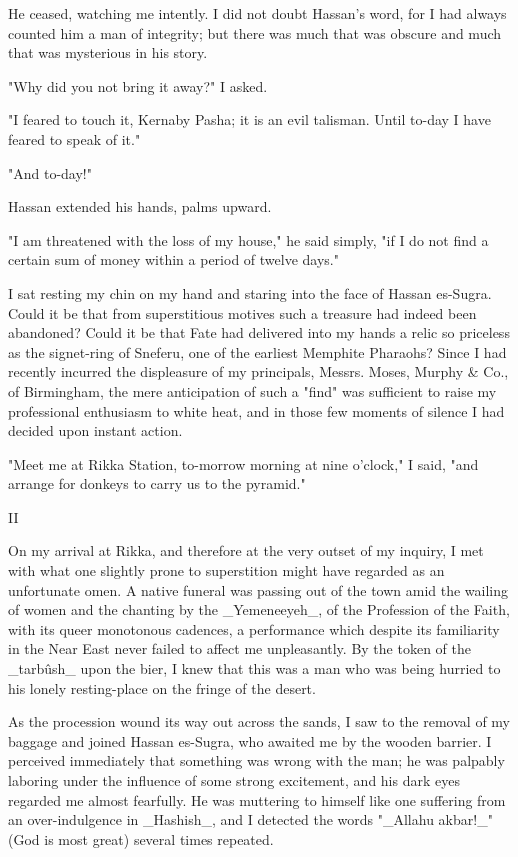 He ceased, watching me intently. I did not doubt Hassan's word, for I
had always counted him a man of integrity; but there was much that was
obscure and much that was mysterious in his story.

"Why did you not bring it away?" I asked.

"I feared to touch it, Kernaby Pasha; it is an evil talisman. Until
to-day I have feared to speak of it."

"And to-day!"

Hassan extended his hands, palms upward.

"I am threatened with the loss of my house," he said simply, "if I do
not find a certain sum of money within a period of twelve days."

I sat resting my chin on my hand and staring into the face of Hassan
es-Sugra. Could it be that from superstitious motives such a treasure
had indeed been abandoned? Could it be that Fate had delivered into
my hands a relic so priceless as the signet-ring of Sneferu, one of
the earliest Memphite Pharaohs? Since I had recently incurred the
displeasure of my principals, Messrs. Moses, Murphy & Co., of
Birmingham, the mere anticipation of such a "find" was sufficient to
raise my professional enthusiasm to white heat, and in those few
moments of silence I had decided upon instant action.

"Meet me at Rikka Station, to-morrow morning at nine o'clock," I said,
"and arrange for donkeys to carry us to the pyramid."


II

On my arrival at Rikka, and therefore at the very outset of my
inquiry, I met with what one slightly prone to superstition might
have regarded as an unfortunate omen. A native funeral was passing
out of the town amid the wailing of women and the chanting by the
_Yemeneeyeh_, of the Profession of the Faith, with its queer
monotonous cadences, a performance which despite its familiarity in
the Near East never failed to affect me unpleasantly. By the token of
the _tarbûsh_ upon the bier, I knew that this was a man who was being
hurried to his lonely resting-place on the fringe of the desert.

As the procession wound its way out across the sands, I saw to the
removal of my baggage and joined Hassan es-Sugra, who awaited me by
the wooden barrier. I perceived immediately that something was wrong
with the man; he was palpably laboring under the influence of some
strong excitement, and his dark eyes regarded me almost fearfully.
He was muttering to himself like one suffering from an over-indulgence
in _Hashish_, and I detected the words "_Allahu akbar!_" (God is most
great) several times repeated.

